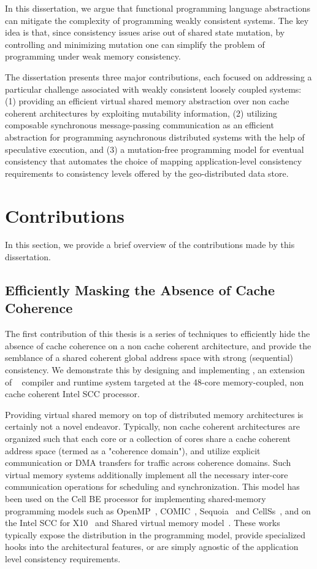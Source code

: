 In this dissertation, we argue that functional programming language
abstractions can mitigate the complexity of programming weakly consistent
systems. The key idea is that, since consistency issues arise out of shared
state mutation, by controlling and minimizing mutation one can simplify the
problem of programming under weak memory consistency.

The dissertation presents three major contributions, each focused on
addressing a particular challenge associated with weakly consistent loosely
coupled systems: (1) providing an efficient virtual shared memory abstraction
over non cache coherent architectures by exploiting mutability information, (2)
utilizing composable synchronous message-passing communication as an efficient
abstraction for programming asynchronous distributed systems with the help of
speculative execution, and (3) a mutation-free programming model for eventual
consistency that automates the choice of mapping application-level consistency
requirements to consistency levels offered by the geo-distributed data store.

\section{Contributions}

In this section, we provide a brief overview of the contributions made by this
dissertation.

\subsection{Efficiently Masking the Absence of Cache Coherence}

The first contribution of this thesis is a series of techniques to efficiently
hide the absence of cache coherence on a non cache coherent architecture, and
provide the semblance of a shared coherent global address space with strong
(sequential) consistency. We demonstrate this by designing and implementing
\MMSCC, an extension of \MM~\cite{JFP14} compiler and runtime system targeted
at the 48-core memory-coupled, non cache coherent Intel SCC processor.

Providing virtual shared memory on top of distributed memory architectures is
certainly not a novel endeavor. Typically, non cache coherent architectures
are organized such that each core or a collection of cores share a cache
coherent address space (termed as a "coherence domain"), and utilize explicit
communication or DMA transfers for traffic across coherence domains. Such
virtual memory systems additionally implement all the necessary inter-core
communication operations for scheduling and synchronization. This model has
been used on the Cell BE processor for implementing shared-memory programming
models such as OpenMP~\cite{OBrien2008}, COMIC~\cite{Lee2008},
Sequoia~\cite{Houston2008} and CellSs~\cite{Bellens2006}, and on the Intel SCC
for X10~\cite{Chapman2011} and Shared virtual memory model~\cite{Lankes2012}.
These works typically expose the distribution in the programming model, provide
specialized hooks into the architectural features, or are simply agnostic of
the application level consistency requirements.

